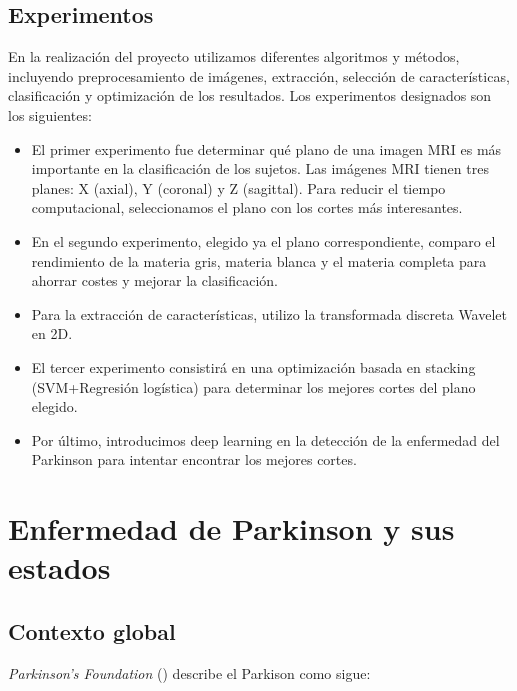 \subsection{Experimentos}

En la realización del proyecto utilizamos diferentes algoritmos y métodos, incluyendo preprocesamiento de imágenes, extracción, selección de características, clasificación y optimización de los resultados. Los experimentos designados son los siguientes:

\begin{itemize}
	\item El primer experimento fue determinar qué plano de una imagen MRI es más importante en la clasificación de los sujetos. Las imágenes MRI tienen tres planes: X (axial), Y (coronal) y Z (sagittal). Para reducir el tiempo computacional, seleccionamos el plano con los cortes más interesantes.
	
	\item En el segundo experimento, elegido ya el plano correspondiente, comparo el rendimiento de la materia gris, materia blanca y el materia completa para ahorrar costes y mejorar la clasificación.
	
	\item Para la extracción de características, utilizo la transformada discreta Wavelet en 2D.
	
	\item El tercer experimento consistirá en una optimización basada en stacking (SVM+Regresión logística) para determinar los mejores cortes del plano elegido.
	
	\item Por último, introducimos deep learning en la detección de la enfermedad del Parkinson para intentar encontrar los mejores cortes.
	
\end{itemize}


\section{Enfermedad de Parkinson y sus estados}

\subsection{Contexto global}

\textit{Parkinson's Foundation} (\cite{pf}) describe el Parkison como sigue: \\

